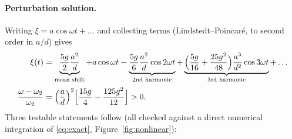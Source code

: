 \documentclass[11pt,a4paper]{article}
\begin{document}
\paragraph{Perturbation solution.} Writing $\xi=a\cos\omega t+\dots$ and collecting terms (Lindstedt--Poincar\'e, to second order in $a/d$) gives
\begin{align}
\xi(t)&=\underbrace{\frac{5g}{2}\frac{a^2}{d}}_{\text{mean shift}}+a\cos\omega t-\underbrace{\frac{5g}{6}\frac{a^2}{d}\cos2\omega t}_{\text{2nd harmonic}}+\underbrace{\Bigl(\frac{5g}{16}+\frac{25g^2}{48}\Bigr)\frac{a^3}{d^2}\cos3\omega t}_{\text{3rd harmonic}}+\dots\label{eq:harmonics}\\[2pt]
\frac{\omega-\omega_2}{\omega_2}&=\Bigl(\frac ad\Bigr)^{2}\Bigl[\frac{15g}{4}-\frac{125g^2}{12}\Bigr]>0 .\label{eq:shift}
\end{align}
Three testable statements follow (all checked against a direct numerical integration of \eqref{eq:exact}, Figure~\ref{fig:nonlinear}):
\end{document}
